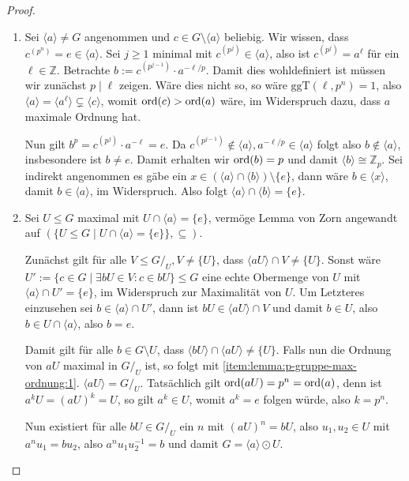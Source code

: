 \begin{proof}{\ }
    \begin{enumerate}
        \item Sei $\langle a \rangle \neq G$ angenommen und $c \in G \setminus \langle a \rangle$ beliebig. Wir wissen, dass $c^{(p^n)} = e \in \langle a \rangle$. Sei $j \geq 1$ minimal mit $c^{(p^j)} \in \langle a \rangle$, also ist
            $c^{(p^j)} = a^\ell$ für ein $\ell\in\mathbb{Z}$. Betrachte $b := c^{(p^{j-1})} \cdot a^{-\ell / p}$. Damit dies wohldefiniert ist müssen wir zunächst $p \mid \ell$ zeigen. Wäre dies nicht so, so wäre $\mathrm{ggT}(\ell, p^n) = 1$, also $\langle a \rangle = \langle a^\ell \rangle \subsetneq \langle c \rangle$, womit $\operatorname{ord}(c) > \operatorname{ord}(a)$ wäre, im Widerspruch dazu, dass $a$ maximale Ordnung hat.
            
            Nun gilt $b^p = c^{(p^j)} \cdot a^{- \ell} = e$. Da $c^{(p^{j-1})} \not\in \langle a \rangle, a^{-\ell / p} \in \langle a \rangle$ folgt also $b \not\in \langle a \rangle$, insbesondere ist $b \neq e$. Damit erhalten wir $\operatorname{ord}(b) = p$ und damit $\langle b \rangle \cong \mathbb{Z}_p$. Sei indirekt angenommen es gäbe ein $x \in (\langle a \rangle \cap \langle b \rangle) \setminus \{e\}$, dann wäre $b \in \langle x \rangle$, damit $b \in \langle a \rangle$, im Widerspruch. Also folgt $\langle a \rangle \cap \langle b \rangle = \{e\}$.

        \item Sei $U \leq G$ maximal mit $U \cap \langle a \rangle = \{e\}$, vermöge Lemma von Zorn angewandt auf $(\{ U \leq G \mid U \cap \langle a \rangle = \{e\} \}, \subseteq)$.
        
        Zunächst gilt für alle $V \leq G/_U, V \neq \{ U \}$, dass $\langle aU \rangle \cap V \neq \{ U \}$. Sonst wäre $U' := \{ c \in G \mid \exists b U \in V: c \in bU \} \leq G$ eine echte Obermenge von $U$ mit $\langle a \rangle \cap U' = \{e\}$, im Widerspruch zur Maximalität von $U$. Um Letzteres einzusehen sei $b \in \langle a \rangle \cap U'$, dann ist $bU \in \langle aU \rangle \cap V$ und damit $b \in U$, also $b \in U \cap \langle a \rangle$, also $b = e$. 
        
        Damit gilt für alle $b \in G \setminus U$, dass $\langle bU \rangle \cap \langle aU \rangle \neq \{ U \}$. Falls nun die Ordnung von $aU$ maximal in $G/_U$ ist, so folgt mit \ref*{item:lemma:p-gruppe-max-ordnung:1}. $\langle a U \rangle = G/_U$. Tatsächlich gilt $\operatorname{ord}(aU) = p^n = \operatorname{ord}(a)$, denn ist $a^k U = (aU)^k = U$, so gilt $a^k \in U$, womit $a^k = e$ folgen würde, also $k = p^n$.

        Nun existiert für alle $bU \in G/_U$ ein $n$ mit $(aU)^n = bU$, also $u_1, u_2 \in U$ mit $a^n u_1 = b u_2$, also $a^n u_1 u_2^{-1} = b$ und damit $G = \langle a \rangle \odot U$.
    \end{enumerate}
\end{proof}

